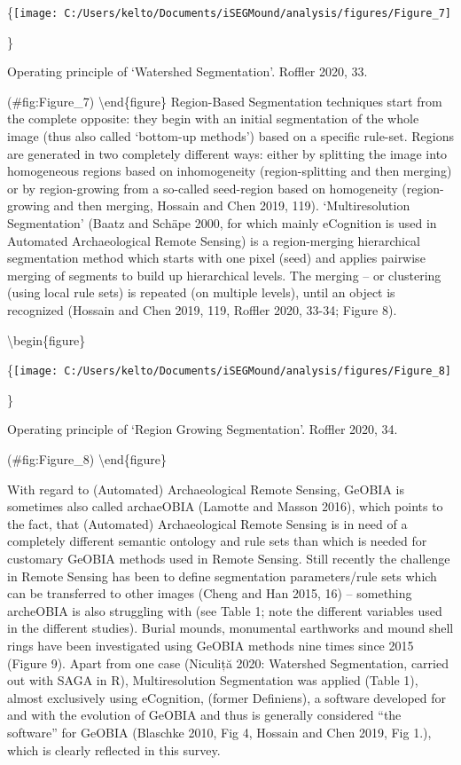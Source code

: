 \documentclass[
]{article}
\begin{document}
\{\centering \texttt{[image: C:/Users/kelto/Documents/iSEGMound/analysis/figures/Figure\_7]}

\}

\caption{Operating principle of ‘Watershed Segmentation’. Roffler 2020, 33.}

(\#fig:Figure\_7)
\textbackslash end\{figure\}
Region-Based Segmentation techniques start from the complete opposite: they begin with an initial segmentation of the whole image (thus also called `bottom-up methods') based on a specific rule-set. Regions are generated in two completely different ways: either by splitting the image into homogeneous regions based on inhomogeneity (region-splitting and then merging) or by region-growing from a so-called seed-region based on homogeneity (region-growing and then merging, Hossain and Chen 2019, 119). `Multiresolution Segmentation' (Baatz and Schäpe 2000, for which mainly eCognition is used in Automated Archaeological Remote Sensing) is a region-merging hierarchical segmentation method which starts with one pixel (seed) and applies pairwise merging of segments to build up hierarchical levels. The merging -- or clustering (using local rule sets) is repeated (on multiple levels), until an object is recognized (Hossain and Chen 2019, 119, Roffler 2020, 33-34; Figure 8).

\textbackslash begin\{figure\}

\{\centering \texttt{[image: C:/Users/kelto/Documents/iSEGMound/analysis/figures/Figure\_8]}

\}

\caption{Operating principle of ‘Region Growing Segmentation’. Roffler 2020, 34.}

(\#fig:Figure\_8)
\textbackslash end\{figure\}

With regard to (Automated) Archaeological Remote Sensing, GeOBIA is sometimes also called archaeOBIA (Lamotte and Masson 2016), which points to the fact, that (Automated) Archaeological Remote Sensing is in need of a completely different semantic ontology and rule sets than which is needed for customary GeOBIA methods used in Remote Sensing. Still recently the challenge in Remote Sensing has been to define segmentation parameters/rule sets which can be transferred to other images (Cheng and Han 2015, 16) -- something archeOBIA is also struggling with (see Table 1; note the different variables used in the different studies).
Burial mounds, monumental earthworks and mound shell rings have been investigated using GeOBIA methods nine times since 2015 (Figure 9). Apart from one case (Niculiță 2020: Watershed Segmentation, carried out with SAGA in R), Multiresolution Segmentation was applied (Table 1), almost exclusively using eCognition, (former Definiens), a software developed for and with the evolution of GeOBIA and thus is generally considered ``the software'' for GeOBIA (Blaschke 2010, Fig 4, Hossain and Chen 2019, Fig 1.), which is clearly reflected in this survey.
\end{document}
